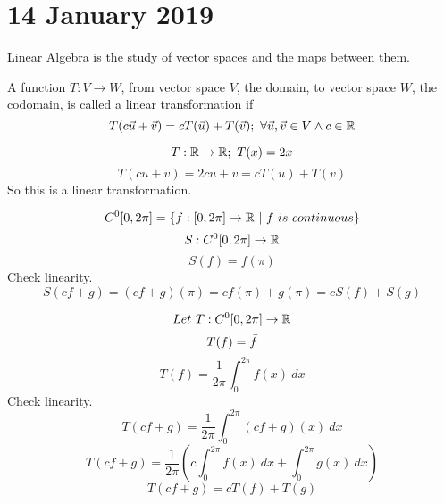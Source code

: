 \section{14 January 2019}
\begin{defn}
Linear Algebra is the study of vector spaces and the maps between them.
\end{defn}

\begin{defn}
A function $T:V\to W$, from vector space $V$, the domain, to vector space $W$, the codomain, is called a linear transformation if
\[T(c\Vec{u}+\Vec{v})=cT(\Vec{u})+T(\Vec{v});\ \forall \Vec{u},\Vec{v}\in V \wedge c\in \R\]
\end{defn}

\begin{ex}
\[T:\mathbb{R}\to\mathbb{R};\ T(x)=2x\]
\[T(cu+v) = 2cu + v = cT(u)+T(v)\]
So this is a linear transformation.
\end{ex}
\begin{ex}
\[C^0[0,2\pi] = \{f:[0,2\pi]\to\R\ |\ f\ is \ continuous\}\]
\[S:C^0[0,2\pi]\to \mathbb{R}\]
\[S(f) = f(\pi)\]
Check linearity.
\[S(cf+g) = (cf+g)(\pi)=cf(\pi)+g(\pi)=cS(f)+S(g)\]
\end{ex}

\begin{ex}
\[Let\ T:C^0[0,2\pi]\to \mathbb{R}\]
\[T(f)=\Bar{f}\]
\[T(f)=\frac{1}{2\pi}\int_0^{2\pi}f(x)\ dx\]
Check linearity.
\[T(cf+g)=\frac{1}{2\pi}\int_0^{2\pi}(cf+g)(x)\ dx\]
\[T(cf+g)=\frac{1}{2\pi}(c\int_0^{2\pi}f(x)\ dx+\int_0^{2\pi}g(x)\ dx)\]
\[T(cf+g)=cT(f)+T(g)\]
\end{ex}

